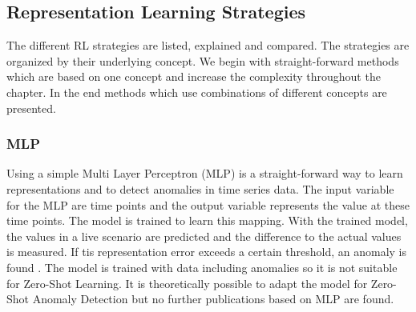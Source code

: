 \subsection{Representation Learning Strategies}
The different RL strategies are listed, explained and compared. The strategies are organized by their underlying concept. We begin with straight-forward methods which are based on one concept and increase the complexity throughout the chapter. In the end methods which use combinations of different concepts are presented.
\subsubsection{MLP}
Using a simple Multi Layer Perceptron (MLP) is a straight-forward way to learn representations and to detect anomalies in time series data. The input variable for the MLP are time points and the output variable represents the value at these time points. The model is trained to learn this mapping. With the trained model, the values in a live scenario are predicted and the difference to the actual values is measured. If tis representation error exceeds a certain threshold, an anomaly is found \cite{jeong_time-series_2022}.
The model is trained with data including anomalies so it is not suitable for Zero-Shot Learning. It is theoretically possible to adapt the model for Zero-Shot Anomaly Detection but no further publications based on MLP are found.
